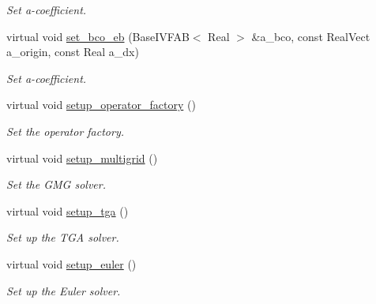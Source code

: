 \begin{DoxyCompactItemize}
\begin{DoxyCompactList}\small\item\em Set a-\/coefficient. \end{DoxyCompactList}\item 
virtual void \hyperlink{classeddington__sp1_a25eb140cc01648a6e9aa0b0d43eb7c9b}{set\+\_\+bco\+\_\+eb} (Base\+I\+V\+F\+AB$<$ Real $>$ \&a\+\_\+bco, const Real\+Vect a\+\_\+origin, const Real a\+\_\+dx)
\begin{DoxyCompactList}\small\item\em Set a-\/coefficient. \end{DoxyCompactList}\item 
virtual void \hyperlink{classeddington__sp1_a3865afb3c3d39c8fb7eaf6fa9857a233}{setup\+\_\+operator\+\_\+factory} ()
\begin{DoxyCompactList}\small\item\em Set the operator factory. \end{DoxyCompactList}\item 
virtual void \hyperlink{classeddington__sp1_a46ec39d8d6b121465871be5afdde4823}{setup\+\_\+multigrid} ()
\begin{DoxyCompactList}\small\item\em Set the G\+MG solver. \end{DoxyCompactList}\item 
virtual void \hyperlink{classeddington__sp1_a344b2157b5de8bd0c62c545d3376a846}{setup\+\_\+tga} ()
\begin{DoxyCompactList}\small\item\em Set up the T\+GA solver. \end{DoxyCompactList}\item 
virtual void \hyperlink{classeddington__sp1_a30299965ab58df5b47b3da250a825061}{setup\+\_\+euler} ()
\begin{DoxyCompactList}\small\item\em Set up the Euler solver. \end{DoxyCompactList}\end{DoxyCompactItemize}
